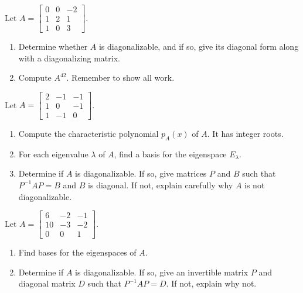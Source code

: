 \documentclass[11pt,twoside,openany]{memoir}
\begin{document}
    \begin{exercise}
    Let $A=\begin{bmatrix} 0 & 0 & -2 \\ 1 & 2 & 1 \\ 1 & 0 & 3\end{bmatrix}$.
    \begin{enumerate}[label = (\arabic*)]
        \item Determine whether $A$ is diagonalizable, and if so, give its diagonal form along with a diagonalizing matrix.
        \item Compute $A^{42}$. Remember to show all work.
    \end{enumerate}
    \end{exercise}
    
    \begin{exercise}
    Let $A=\begin{bmatrix} 2 & -1 & -1 \\ 1 & 0 & -1 \\ 1 & -1 & 0\end{bmatrix}$.
    \begin{enumerate}[label = (\arabic*)]
        \item Compute the characteristic polynomial $p_A(x)$ of $A$. It has integer roots.
        \item For each eigenvalue $\lambda$ of $A$, find a basis for the eigenspace $E_{\lambda}$.
        \item Determine if $A$ is diagonalizable. If so, give matrices $P$ and $B$ such that $P^{-1}AP=B$ and $B$ is diagonal. If not, explain carefully why $A$ is not diagonalizable.
    \end{enumerate}
    \end{exercise}
    
    \begin{exercise}
    Let $A=\begin{bmatrix} 6 & -2 & -1 \\ 10 & -3 & -2 \\ 0 & 0 & 1\end{bmatrix}$.
    \begin{enumerate}[label = (\arabic*)]
        \item Find bases for the eigenspaces of $A$.
        \item Determine if $A$ is diagonalizable. If so, give an invertible matrix $P$ and diagonal matrix $D$ such that $P^{-1}AP=D$. If not, explain why not.
    \end{enumerate}
    \end{exercise}
    
\end{document}
